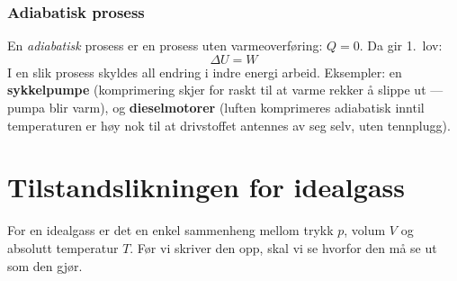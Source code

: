 
\subsubsection*{Adiabatisk prosess}
En \emph{adiabatisk} prosess er en prosess uten varmeoverføring: $Q = 0$. Da gir 1.\ lov:
\[
  \Delta U = W
\]
I en slik prosess skyldes all endring i indre energi arbeid. Eksempler: en \textbf{sykkelpumpe} (komprimering skjer for raskt til at varme rekker å slippe ut — pumpa blir varm), og \textbf{dieselmotorer} (luften komprimeres adiabatisk inntil temperaturen er høy nok til at drivstoffet antennes av seg selv, uten tennplugg).





\section{Tilstandslikningen for idealgass}

For en idealgass er det en enkel sammenheng mellom trykk $p$, volum $V$ og
absolutt temperatur $T$. Før vi skriver den opp, skal vi se hvorfor den må se ut som den gjør.

